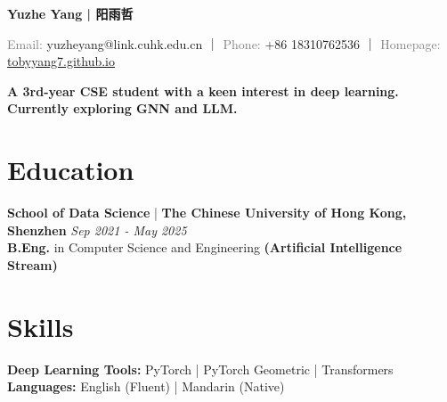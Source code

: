 \documentclass[a4paper,8pt]{article}
\newcommand{\contact}[2]{\noindent\textcolor{gray}{#1:} #2}
\begin{document}
\newcommand{\name}[1]{\noindent\textbf{\LARGE #1}\vspace{0.5em}}

\begin{center}
\vspace{-0.2in}
\name{Yuzhe Yang | 阳雨哲}

\contact{Email}{yuzheyang@link.cuhk.edu.cn} ｜ \contact{Phone}{+86 18310762536} ｜ \contact{Homepage}{\href{https://tobyyang7.github.io/}{tobyyang7.github.io}}

\textbf{A 3rd-year CSE student with a keen interest in deep learning. Currently exploring GNN and LLM.\\}

\end{center}

\section*{Education}
\textbf{School of Data Science} | \textbf{The Chinese University of Hong Kong, Shenzhen} \hfill \textit{Sep 2021 - May 2025}\\
\textbf{B.Eng.} in Computer Science and Engineering \textbf{(Artificial Intelligence Stream)}



\section*{Skills}
\textbf{Deep Learning Tools:} PyTorch | PyTorch Geometric | Transformers \hfill
\textbf{Languages:} English (Fluent) | Mandarin (Native)

\end{document}
